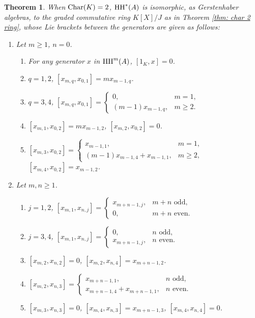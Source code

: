 \documentclass[10pt, reqno]{amsart}
\newtheorem{theorem}{Theorem}[section]
\theoremstyle{definition}
\theoremstyle{remark}
\numberwithin{equation}{section}
\begin{document}
\begin{theorem}\label{thm:  char two Gerstenhaber bracket}
    When \( \mathrm{Char}(K) = 2\),  \(\mathrm{HH}^*(A)\)  is isomorphic, as Gerstenhaber algebras,  to the graded commutative ring $K[X]/J$ as in Theorem \ref{thm: char 2 ring},  whose  Lie brackets between the   generators  are given as follows:
    \begin{enumerate}
     \item Let \(m\ge 1\), \(n = 0\). \begin{enumerate} 
            \item For any generator $x$ in \(\mathrm{HH}^m(A)\), $[1_K, x]=0$.
            \item $q=1,2$, $[x_{m,q}, x_{0,1}] = mx_{m-1,q}$.
            \item $q=3,4$, $[x_{m,q}, x_{0,1}] = \begin{cases}
                0, & m=1,\\
             (m-1)x_{m-1,q}, & m\ge 2.
            \end{cases}$
            \item $[x_{m,1}, x_{0,2}] = mx_{m-1,2}$, $[x_{m,2}, x_{0,2}] =0$.
            \item $[x_{m,3}, x_{0,2}] = \begin{cases}
                x_{m-1,1}, & m= 1,\\
                (m-1)x_{m-1,4} + x_{m-1,1}, & m\ge 2,
            \end{cases}$ $[x_{m,4}, x_{0,2}] = x_{m-1,2}$.
        \end{enumerate}
     \item Let \(m,n\ge 1\). \begin{enumerate}
            \item $j=1,2$, $[x_{m,1}, x_{n,j}] =
      \begin{cases}
        x_{m+n-1,j}, &  m+n \text{ odd},\\
        0, & m+n \text{ even}.
      \end{cases}$
           \item $j=3,4$,  $[x_{m,1}, x_{n,j}] =
      \begin{cases}
        0, & n \text{ odd},\\
       x_{m+n-1,j}, & n \text{ even}.
      \end{cases}$
          \item $[x_{m,2}, x_{n,2}] =0$, $[x_{m,2}, x_{n,4}] =x_{m+n-1,2}$.
          \item $[x_{m,2}, x_{n,3}] =
      \begin{cases}
        x_{m+n-1,1}, &  n \text{ odd},\\
        x_{m+n-1,4} + x_{m+n-1,1}, & n \text{ even}.
      \end{cases}$
         \item $[x_{m,3}, x_{n,3}] =0$, $[x_{m,4}, x_{n,3}] = x_{m+n-1,3}$,
      $[x_{m,4},x_{n,4}] = 0$.
        \end{enumerate}
    \end{enumerate}
\end{theorem}
\end{document}
